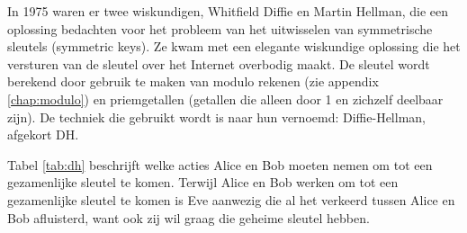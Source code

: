 In 1975 waren er twee wiskundigen, Whitfield Diffie en Martin Hellman, die een oplossing bedachten voor het probleem van het uitwisselen van symmetrische sleutels (symmetric keys). Ze kwam met een elegante wiskundige oplossing die het versturen van de sleutel over het Internet overbodig maakt. De sleutel wordt berekend door gebruik te maken van modulo rekenen (zie appendix \ref{chap:modulo}) en priemgetallen (getallen die alleen door 1 en zichzelf deelbaar zijn). De techniek die gebruikt wordt is naar hun vernoemd: Diffie-Hellman, afgekort DH.

Tabel \ref{tab:dh} beschrijft welke acties Alice en Bob moeten nemen om tot een gezamenlijke sleutel te komen. Terwijl Alice en Bob werken om tot een gezamenlijke sleutel te komen is Eve aanwezig die al het verkeerd tussen Alice en Bob afluisterd, want ook zij wil graag die geheime sleutel hebben.

